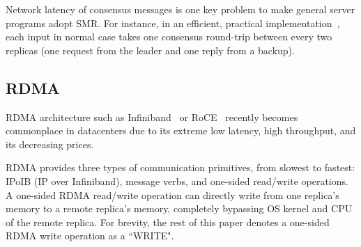 Network latency of consensus messages is one key problem to make general server 
programs adopt SMR. For instance, in an efficient, practical 
\paxos implementation~\cite{paxos:practical}, each input in normal case takes 
one consensus round-trip between every two replicas (one request from the 
leader and one reply from a backup).

\subsection{RDMA} \label{sec:rdma}

RDMA architecture such as Infiniband~\cite{infiniband} or RoCE~\cite{roce} 
recently becomes commonplace in datacenters due to its extreme low latency, 
high throughput, and its decreasing prices. 

RDMA provides three types of communication primitives, from slowest to 
fastest: IPoIB (IP over Infiniband), message verbs, and one-sided read/write 
operations. A one-sided RDMA read/write operation can directly write from one 
replica's memory to a remote replica's memory, completely bypassing OS kernel 
and CPU of the remote replica. For brevity, the rest of this paper denotes a 
one-sided RDMA write operation as a ``WRITE".



